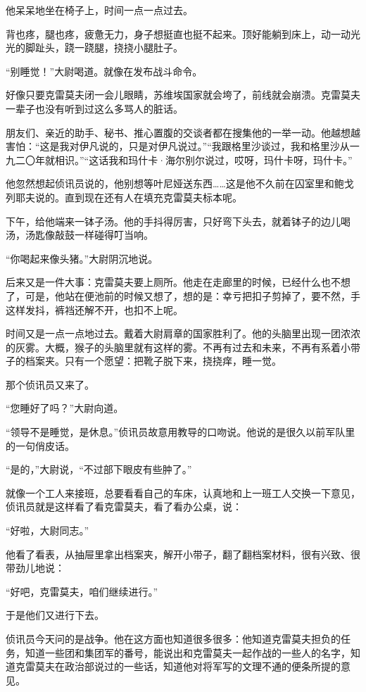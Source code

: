 他呆呆地坐在椅子上，时间一点一点过去。

背也疼，腿也疼，疲惫无力，身子想挺直也挺不起来。顶好能躺到床上，动一动光光的脚趾头，跷一跷腿，挠挠小腿肚子。

“别睡觉！”大尉喝道。就像在发布战斗命令。

好像只要克雷莫夫闭一会儿眼睛，苏维埃国家就会垮了，前线就会崩溃。克雷莫夫一辈子也没有听到过这么多骂人的脏话。

朋友们、亲近的助手、秘书、推心置腹的交谈者都在搜集他的一举一动。他越想越害怕：“这是我对伊凡说的，只是对伊凡说过。”“我跟格里沙谈过，我和格里沙从一九二〇年就相识。”“这话我和玛什卡·海尔别尔说过，哎呀，玛什卡呀，玛什卡。”

他忽然想起侦讯员说的，他别想等叶尼娅送东西……这是他不久前在囚室里和鲍戈列耶夫说的。直到现在还有人在填充克雷莫夫标本呢。

下午，给他端来一钵子汤。他的手抖得厉害，只好弯下头去，就着钵子的边儿喝汤，汤匙像敲鼓一样碰得叮当响。

“你喝起来像头猪。”大尉阴沉地说。

后来又是一件大事：克雷莫夫要上厕所。他走在走廊里的时候，已经什么也不想了，可是，他站在便池前的时候又想了，想的是：幸亏把扣子剪掉了，要不然，手这样发抖，裤裆还解不开，也扣不上呢。

时间又是一点一点地过去。戴着大尉肩章的国家胜利了。他的头脑里出现一团浓浓的灰雾。大概，猴子的头脑里就有这样的雾。不再有过去和未来，不再有系着小带子的档案夹。只有一个愿望：把靴子脱下来，挠挠痒，睡一觉。

那个侦讯员又来了。

“您睡好了吗？”大尉向道。

“领导不是睡觉，是休息。”侦讯员故意用教导的口吻说。他说的是很久以前军队里的一句俏皮话。

“是的，”大尉说，“不过部下眼皮有些肿了。”

就像一个工人来接班，总要看看自己的车床，认真地和上一班工人交换一下意见，侦讯员就是这样看了看克雷莫夫，看了看办公桌，说：

“好啦，大尉同志。”

他看了看表，从抽屉里拿出档案夹，解开小带子，翻了翻档案材料，很有兴致、很带劲儿地说：

“好吧，克雷莫夫，咱们继续进行。”

于是他们又进行下去。

侦讯员今天问的是战争。他在这方面也知道很多很多：他知道克雷莫夫担负的任务，知道一些团和集团军的番号，能说出和克雷莫夫一起作战的一些人的名字，知道克雷莫夫在政治部说过的一些话，知道他对将军写的文理不通的便条所提的意见。

